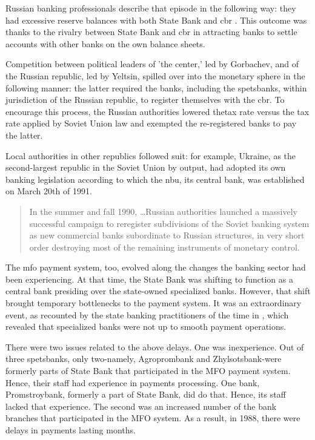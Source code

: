 Russian banking professionals describe that episode in the following way: they had excessive reserve balances with both State Bank and \ac{cbr} \citep[p.~491]{krotov2008b}. This outcome was thanks to the rivalry between State Bank and \ac{cbr} in attracting banks to settle accounts with other banks on the own balance sheets. 

Competition between political leaders of 'the center,' led by Gorbachev, and of the Russian republic, led by Yeltsin, spilled over into the monetary sphere in the following manner: the latter required the banks, including the spetsbanks, within jurisdiction of the Russian republic, to register themselves with the \ac{cbr}. To encourage this process, the Russian authorities lowered thetax rate versus the tax rate applied by Soviet Union law and exempted the re-registered banks to pay the latter. 

Local authorities in other republics followed suit: for example, Ukraine, as the second-largest republic in the Soviet Union by output, had adopted its own banking legislation according to which the \acf{nbu}, its central bank, was established on March 20th of 1991.

\begin{quote}
In the summer and fall 1990, \dots Russian authorities launched a massively successful campaign to reregister subdivisions of the Soviet banking system as new commercial banks subordinate to Russian structures, in very short order destroying most of the remaining instruments of monetary control.~\citep[p.~74]{woodruff1999}
\end{quote}

The \ac{mfo} payment system, too, evolved along the changes the banking sector had been experiencing. At that time, the State Bank was shifting to function as a central bank presiding over the state-owned specialized banks. However, that shift brought temporary bottlenecks to the payment system. It was an extraordinary event, as recounted by the state banking practitioners of the time in \citep{krotov2008b}, which revealed that specialized banks were not up to smooth payment operations.

There were two issues related to the above delays. One was inexperience. Out of three spetsbanks, only two-namely, Agroprombank and Zhylsotsbank-were formerly parts of State Bank that participated in the MFO payment system. Hence, their staff had experience in payments processing. One bank, Promstroybank, formerly a part of State Bank, did do that. Hence, its staff lacked that experience. The second was an increased number of the bank branches that participated in the MFO system. As a result, in 1988, there were delays in payments lasting months. 

